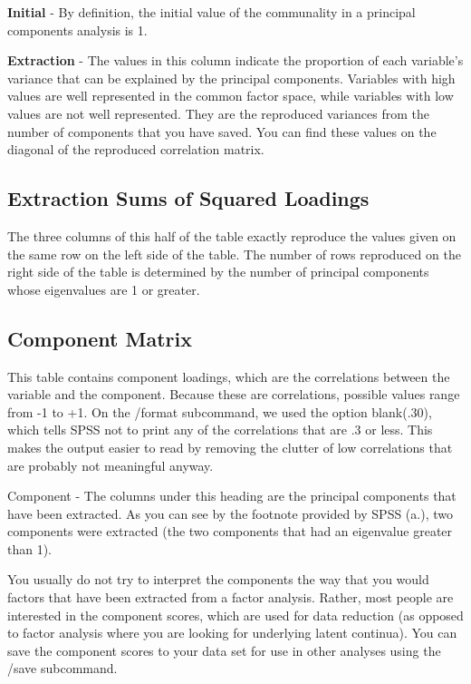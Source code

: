 \textbf{Initial} - By definition, the initial value of the communality in a principal components analysis is 1. 

\textbf{Extraction}  - The values in this column indicate the proportion of each variable's variance that can be explained by the principal components.  Variables with high values are well represented in the common factor space, while variables with low values are not well represented. They are the reproduced variances from the number of components that you have saved.  You can find these values on the diagonal of the reproduced correlation matrix.

\subsection{Extraction Sums of Squared Loadings} 

The three columns of this half of the table exactly reproduce the values given on the same row on the left side of the table.  The number of rows reproduced on the right side of the table is determined by the number of principal components whose eigenvalues are 1 or greater.

\subsection{Component Matrix} This table contains component loadings, which are the correlations between the variable and the component.  Because these are correlations, possible values range from -1 to +1.  On the /format subcommand, we used the option blank(.30), which tells SPSS not to print any of the correlations that are .3 or less.  This makes the output easier to read by removing the clutter of low correlations that are probably not meaningful anyway. 

Component - The columns under this heading are the principal components that have been extracted.  As you can see by the footnote provided by SPSS (a.), two components were extracted (the two components that had an eigenvalue greater than 1). 

 You usually do not try to interpret the components the way that you would factors that have been extracted from a factor analysis.  Rather, most people are interested in the component scores, which are used for data reduction (as opposed to factor analysis where you are looking for underlying latent continua).  You can save the component scores to your data set for use in other analyses using the /save subcommand.
